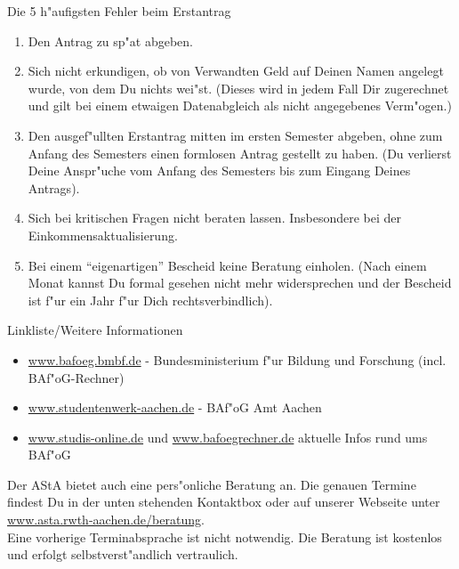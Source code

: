 \vspace{-0.1cm}
\begin{artikel}{Die 5 h"aufigsten Fehler beim Erstantrag}
\vspace{-0.6cm}
\begin{enumerate}
\item Den Antrag zu sp"at abgeben.
\item Sich nicht erkundigen, ob von Verwandten Geld auf Deinen Namen angelegt wurde, von dem Du nichts wei"st. (Dieses wird in jedem Fall Dir zugerechnet und gilt bei einem etwaigen Datenabgleich als nicht angegebenes Verm"ogen.)
\item Den ausgef"ullten Erstantrag mitten im ersten Semester abgeben, ohne zum Anfang des Semesters einen formlosen Antrag gestellt zu haben. (Du verlierst Deine Anspr"uche vom Anfang des Semesters bis zum Eingang Deines Antrags).
\item Sich bei kritischen Fragen nicht beraten lassen. Insbesondere bei der Einkommensaktualisierung.
\item Bei einem "`eigenartigen"' Bescheid keine Beratung einholen. (Nach einem Monat kannst Du formal gesehen nicht mehr widersprechen und der Bescheid ist f"ur ein Jahr f"ur Dich rechtsverbindlich).
\end{enumerate}
Linkliste/Weitere Informationen
\begin{itemize}
\item \href{http://www.bafoeg.bmbf.de}{www.bafoeg.bmbf.de} - Bundesministerium f"ur Bildung und Forschung (incl. BAf"oG-Rechner)
\item \href{http://www.studentenwerk-aachen.de}{www.studentenwerk-aachen.de} - BAf"oG Amt Aachen
\item \href{http://www.studis-online.de}{www.studis-online.de} und \href{http://www.bafoegrechner.de}{www.bafoegrechner.de} aktuelle Infos rund ums BAf"oG
\end{itemize}
Der AStA bietet auch eine pers"onliche Beratung an. Die genauen Termine findest Du in der unten stehenden Kontaktbox oder auf unserer Webseite unter \href{http://www.asta.rwth-aachen.de/beratung}{www.asta.rwth-aachen.de/beratung}.\\

Eine vorherige Terminabsprache ist nicht notwendig. Die Beratung ist kostenlos und erfolgt selbstverst"andlich vertraulich.
\end{artikel}

